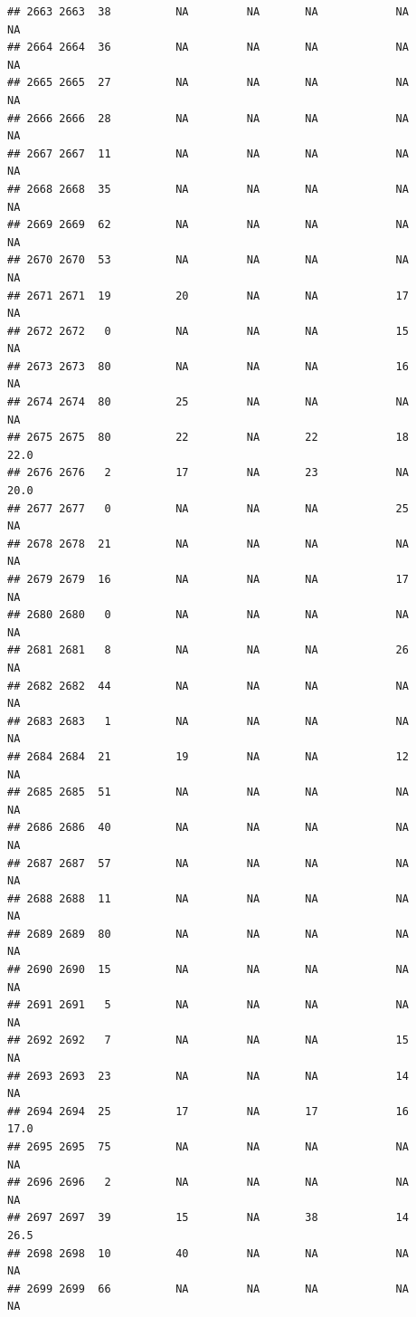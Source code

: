 \documentclass[man]{apa6}
\begin{document}
\begin{verbatim}
## 2663 2663  38          NA         NA       NA            NA       NA
## 2664 2664  36          NA         NA       NA            NA       NA
## 2665 2665  27          NA         NA       NA            NA       NA
## 2666 2666  28          NA         NA       NA            NA       NA
## 2667 2667  11          NA         NA       NA            NA       NA
## 2668 2668  35          NA         NA       NA            NA       NA
## 2669 2669  62          NA         NA       NA            NA       NA
## 2670 2670  53          NA         NA       NA            NA       NA
## 2671 2671  19          20         NA       NA            17       NA
## 2672 2672   0          NA         NA       NA            15       NA
## 2673 2673  80          NA         NA       NA            16       NA
## 2674 2674  80          25         NA       NA            NA       NA
## 2675 2675  80          22         NA       22            18     22.0
## 2676 2676   2          17         NA       23            NA     20.0
## 2677 2677   0          NA         NA       NA            25       NA
## 2678 2678  21          NA         NA       NA            NA       NA
## 2679 2679  16          NA         NA       NA            17       NA
## 2680 2680   0          NA         NA       NA            NA       NA
## 2681 2681   8          NA         NA       NA            26       NA
## 2682 2682  44          NA         NA       NA            NA       NA
## 2683 2683   1          NA         NA       NA            NA       NA
## 2684 2684  21          19         NA       NA            12       NA
## 2685 2685  51          NA         NA       NA            NA       NA
## 2686 2686  40          NA         NA       NA            NA       NA
## 2687 2687  57          NA         NA       NA            NA       NA
## 2688 2688  11          NA         NA       NA            NA       NA
## 2689 2689  80          NA         NA       NA            NA       NA
## 2690 2690  15          NA         NA       NA            NA       NA
## 2691 2691   5          NA         NA       NA            NA       NA
## 2692 2692   7          NA         NA       NA            15       NA
## 2693 2693  23          NA         NA       NA            14       NA
## 2694 2694  25          17         NA       17            16     17.0
## 2695 2695  75          NA         NA       NA            NA       NA
## 2696 2696   2          NA         NA       NA            NA       NA
## 2697 2697  39          15         NA       38            14     26.5
## 2698 2698  10          40         NA       NA            NA       NA
## 2699 2699  66          NA         NA       NA            NA       NA

\end{verbatim}
\end{document}
